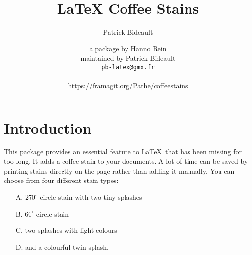 \documentclass[a4paper, 11pt, BCOR = 0 pt, oneside, english]{scrartcl}
\author{Patrick Bideault}
\begin{document}
  \pagestyle{titlepage}
\title{LaTeX Coffee Stains}
\author{a package by Hanno Rein\\
  maintained by Patrick Bideault\\
  \texttt{pb-latex@gmx.fr}\\
  ~\\
  \url{https://framagit.org/Pathe/coffeestains}}
\maketitle


\section{Introduction}
This package provides an essential feature to \LaTeX~that has been missing for
too long. It adds a coffee stain to your documents. A lot of time can be saved
by printing stains directly on the page rather than adding it manually. You can
choose from four different stain types:
\begin{itemize}
  \item[A.] $270^\circ$ circle stain with two tiny splashes 
  \item[B.] $60^\circ$ circle stain 
  \item[C.] two splashes with light colours
  \item[D.] and a colourful twin splash.
\end{itemize}
\end{document}
